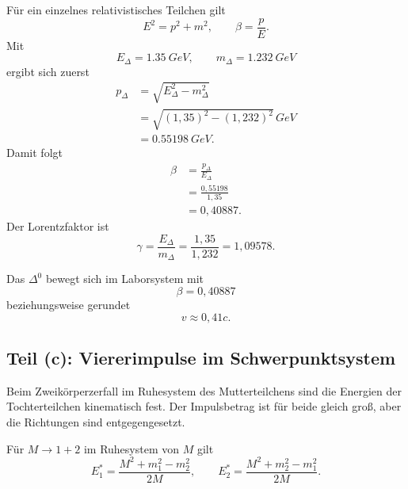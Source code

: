 \documentclass[11pt,a4paper]{scrartcl}
\newcommand{\GeV}{\si{GeV}}
\newcommand{\Dzero}{\Delta^0}
\theoremstyle{definition}
\theoremstyle{plain}
\theoremstyle{remark}
\begin{document}
\begin{calculationbox}
F\"ur ein einzelnes relativistisches Teilchen gilt
\[
    E^2=p^2+m^2,
    \qquad
    \beta=\frac{p}{E}.
\]
Mit
\[
    E_\Delta=\SI{1,35}{GeV},
    \qquad
    m_\Delta=\SI{1,232}{GeV}
\]
ergibt sich zuerst
\begin{align*}
    p_\Delta
    &=\sqrt{E_\Delta^2-m_\Delta^2} \\
    &=\sqrt{(1,35)^2-(1,232)^2}\,\GeV \\
    &=\SI{0,55198}{GeV}.
\end{align*}
Damit folgt
\begin{align*}
    \beta
    &=\frac{p_\Delta}{E_\Delta} \\
    &=\frac{0,55198}{1,35} \\
    &=0,40887.
\end{align*}
Der Lorentzfaktor ist
\[
    \gamma=\frac{E_\Delta}{m_\Delta}
    =\frac{1,35}{1,232}
    =1,09578.
\]
\end{calculationbox}

\begin{answerbox}
Das $\Dzero$ bewegt sich im Laborsystem mit
\[
    \boxed{\beta=0,40887}
\]
beziehungsweise gerundet
\[
    \boxed{v\approx 0,41c}.
\]
\end{answerbox}

\subsection{Teil (c): Viererimpulse im Schwerpunktsystem}

\begin{presentationbox}
Beim Zweik\"orperzerfall im Ruhesystem des Mutterteilchens sind die Energien der Tochterteilchen kinematisch fest. Der Impulsbetrag ist f\"ur beide gleich gro\ss, aber die Richtungen sind entgegengesetzt.
\end{presentationbox}

\begin{formulabox}[title=Zweik\"orperzerfall]
F\"ur $M\to 1+2$ im Ruhesystem von $M$ gilt
\[
    E_1^\ast=\frac{M^2+m_1^2-m_2^2}{2M},
    \qquad
    E_2^\ast=\frac{M^2+m_2^2-m_1^2}{2M}.
\]
\end{formulabox}
\end{document}
